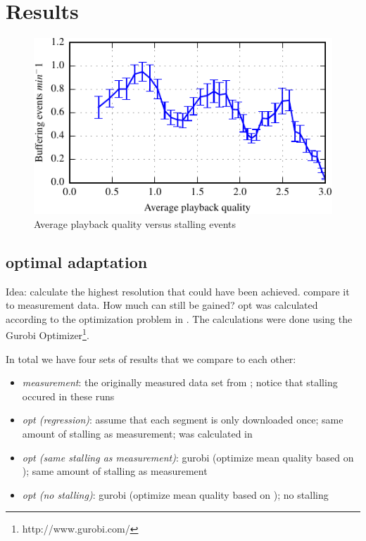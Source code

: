 
\section{Results}
\label{sec:results}

\begin{figure}[t]
\centering
\includegraphics[width=0.95\linewidth]{figs/33qualityvstalling}%
\caption{Average playback quality versus stalling events}
\label{fig:qualityvsstalling}%
\end{figure}

\subsection{optimal adaptation}

Idea: calculate the highest resolution that could have been achieved. compare it to measurement data. How much can still be gained?
opt was calculated according to the optimization problem in \cite{hossfeld2015identifying}. The calculations were done using the Gurobi Optimizer\footnote{http://www.gurobi.com/}.

In total we have four sets of results that we compare to each other:
\begin{itemize}
\item \textit{measurement}: the originally measured data set from \cite{sieber16sacrificing}; notice that stalling occured in these runs
\item \textit{opt (regression)}: assume that each segment is only downloaded once; same amount of stalling as measurement; was calculated in \cite{sieber16sacrificing}
\item \textit{opt (same stalling as measurement)}: gurobi (optimize mean quality based on \cite{hossfeld2015identifying}); same amount of stalling as measurement
\item \textit{opt (no stalling)}: gurobi (optimize mean quality based on \cite{hossfeld2015identifying}); no stalling
\end{itemize}

